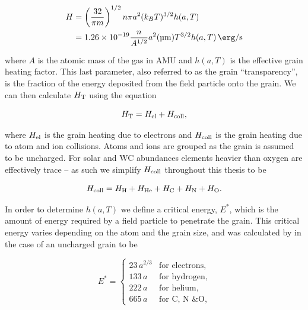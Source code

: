 \begin{equation}
  \label{eq:grainheatingratech3}
  \begin{split}
    H & = \left(\frac{32}{\pi m}\right)^{1/2} n\pi a^2 (k_B T)^{3/2} h(a,T) \\
    & = \num{1.26e-19} \frac{n}{A^{1/2}} a^2 (\si{\micro\metre}) T^{3/2} h(a,T) \, \si{\erg\per\second}
  \end{split}
\end{equation}

\noindent
where $A$ is the atomic mass of the gas in AMU and $h(a,T)$ is the effective grain heating factor.
This last parameter, also referred to as the grain ``transparency'', is the fraction of the energy deposited from the field particle onto the grain.
We can then calculate $H_\text{T}$ using the equation

\begin{equation}
  \label{eq:calchcolltotal}
  H_\text{T} = H_\text{el} + H_\text{coll},
\end{equation}

\noindent
where $H_\text{el}$ is the grain heating due to electrons and $H_\text{coll}$ is the grain heating due to atom and ion collisions.
Atoms and ions are grouped as the grain is assumed to be uncharged.
For solar and WC abundances elements heavier than oxygen are effectively trace -- as such we simplify $H_\text{coll}$ throughout this thesis to be

\begin{equation}
  \label{eq:atomionheatingrate}
  H_\text{coll} = H_\text{H} + H_\text{He} + H_\text{C} + H_\text{N} + H_\text{O} . 
\end{equation}

\noindent
In order to determine $h(a,T)$ we define a critical energy, $E^*$, which is the amount of energy required by a field particle to penetrate the grain. 
This critical energy varies depending on the atom and the grain size, and was calculated by \textcite{dwek_infrared_1981} in the case of an uncharged grain to be

\begin{equation}
  E^* =
  \begin{cases}
    23  \, a^{2/3} & \text{for electrons} , \\
    133 \, a & \text{for hydrogen} , \\
    222 \, a & \text{for helium} , \\
    665 \, a & \text{for C, N \& O} ,
  \end{cases}
\end{equation}

